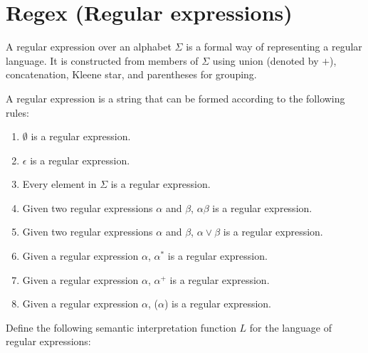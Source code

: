 \documentclass[hidelinks,12pt]{article}
\begin{document}
\section{Regex (Regular expressions)}

A regular expression over an alphabet $\Sigma$ is a formal way of representing
a regular language. It is constructed from members of $\Sigma$ using union
(denoted by $+$), concatenation, Kleene star, and parentheses for grouping.

A regular expression is a string that can be formed according to the following rules:
\begin{enumerate}
    \item $\emptyset$ is a regular expression.
    \item $\epsilon$ is a regular expression.
    \item Every element in $\Sigma$ is a regular expression.
    \item Given two regular expressions $\alpha$ and $\beta$, $\alpha\beta$ is a regular expression.
    \item Given two regular expressions $\alpha$ and $\beta$, $\alpha \lor \beta$ is a regular expression.
    \item Given a regular expression $\alpha$, $\alpha^*$ is a regular expression.
    \item Given a regular expression $\alpha$, $\alpha^+$ is a regular expression.
    \item Given a regular expression $\alpha$, ($\alpha$) is a regular expression.
\end{enumerate}

Define the following semantic interpretation function \( L \) for the language of regular expressions:
\end{document}
